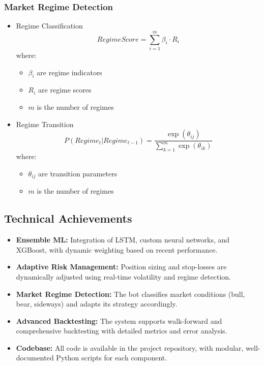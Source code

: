 \documentclass[conference]{IEEEtran}
\begin{document}
\subsubsection{Market Regime Detection}
\begin{itemize}
    \item Regime Classification
    \begin{equation}
    RegimeScore = \sum_{i=1}^m \beta_i \cdot R_i
    \end{equation}
    where:
    \begin{itemize}
        \item $\beta_i$ are regime indicators
        \item $R_i$ are regime scores
        \item $m$ is the number of regimes
    \end{itemize}
    
    \item Regime Transition
    \begin{equation}
    P(Regime_t | Regime_{t-1}) = \frac{\exp(\theta_{ij})}{\sum_{k=1}^m \exp(\theta_{ik})}
    \end{equation}
    where:
    \begin{itemize}
        \item $\theta_{ij}$ are transition parameters
        \item $m$ is the number of regimes
    \end{itemize}
\end{itemize}

\subsection{Technical Achievements}
\begin{itemize}
    \item \textbf{Ensemble ML:} Integration of LSTM, custom neural networks, and XGBoost, with dynamic weighting based on recent performance.
    \item \textbf{Adaptive Risk Management:} Position sizing and stop-losses are dynamically adjusted using real-time volatility and regime detection.
    \item \textbf{Market Regime Detection:} The bot classifies market conditions (bull, bear, sideways) and adapts its strategy accordingly.
    \item \textbf{Advanced Backtesting:} The system supports walk-forward and comprehensive backtesting with detailed metrics and error analysis.
    \item \textbf{Codebase:} All code is available in the project repository, with modular, well-documented Python scripts for each component.
\end{itemize}
\end{document}
